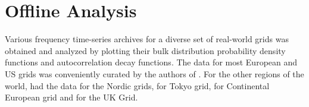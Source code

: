 \section[Offline/Postmortem Analysis]{Offline Analysis}
\label{sec:offline}

Various frequency time-series archives for a diverse set of real-world grids was obtained and analyzed by plotting their bulk distribution probability density functions and autocorrelation decay functions. The data for most European and US grids was conveniently curated by the authors of \cite{lrydin01, lrydinGithub}. For the other regions of the world, \cite{nordic2018, nordic2019} had the data for the Nordic grids, \cite{tokyo2017, tokyo2020} for Tokyo grid, \cite{ce2019, ce2020} for Continental European grid and \cite{ukNationalGridESOData} for the UK Grid.